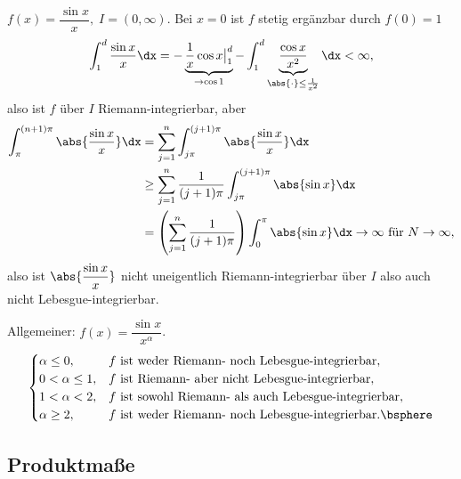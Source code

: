 \begin{bsp}
\label{bsp:3.46}
$f(x) = \dfrac{\sin x}{x},\; I = (0,\infty)$. Bei $x=0$ ist $f$ stetig
ergänzbar durch $f(0) = 1$
\begin{align*}
\int_1^d \frac{\sin x}{x} \dx = -\underbrace{\frac{1}{x}\cos x\big|_1^d}_{\to
\cos 1} - \int_1^d \underbrace{\frac{\cos x}{x^2}}_{\abs{\cdot}\le
\frac{1}{x^2}}\dx < \infty,
\end{align*}
also ist $f$ über $I$ Riemann-integrierbar, aber
\begin{align*}
\int_\pi^{(n+1)\pi} \abs{\frac{\sin x}{x}} \dx
&= \sum\limits_{j=1}^n \int_{j\pi}^{(j+1)\pi} \abs{\frac{\sin x}{x}} \dx
\\ &\ge \sum\limits_{j=1}^n \frac{1}{(j+1)\pi} \int_{j\pi}^{(j+1)\pi} \abs{\sin
x}\dx \\ &= \left(\sum\limits_{j=1}^n \frac{1}{(j+1)\pi} \right)\int_0^\pi
\abs{\sin x}\dx \to \infty \text{ für } N\to\infty,
\end{align*}
also ist $\abs{\dfrac{\sin x}{x}}$ nicht uneigentlich Riemann-integrierbar über
$I$ also auch nicht Lebesgue-integrierbar.

Allgemeiner: $f(x) = \dfrac{\sin x}{x^\alpha}$.
\begin{align*}
\begin{cases}
\alpha\le 0, & f \text{ ist weder Riemann- noch Lebesgue-integrierbar},\\
0<\alpha \le 1, & f \text{ ist Riemann- aber nicht Lebesgue-integrierbar},\\
1<\alpha<2, & f \text{ ist sowohl Riemann- als auch Lebesgue-integrierbar},\\
\alpha \ge 2, & f \text{ ist weder Riemann- noch Lebesgue-integrierbar}.\bsphere 
\end{cases}
\end{align*}
\end{bsp}

\subsection{Produktmaße}

